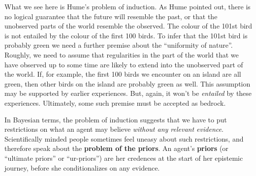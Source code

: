 What we see here is Hume's problem of induction. As Hume pointed out, there is
no logical guarantee that the future will resemble the past, or that the
unobserved parts of the world resemble the observed. The colour of the 101st
bird is not entailed by the colour of the first 100 birds. To infer that the
101st bird is probably green we need a further premise about the ``uniformity of
nature''. Roughly, we need to assume that regularities in the part of the world
that we have observed up to some time are likely to extend into the unobserved
part of the world. If, for example, the first 100 birds we encounter on an
island are all green, then other birds on the island are probably green as well.
This assumption may be supported by earlier experiences. But, again, it won't be
\emph{entailed} by these experiences. Ultimately, some such premise must be
accepted as bedrock.

In Bayesian terms, the problem of induction suggests that we have to put
restrictions on what an agent may believe \emph{without any relevant evidence}.
Scientifically minded people sometimes feel uneasy about such restrictions, and
therefore speak about the \textbf{problem of the priors}. An agent's
\textbf{priors} (or ``ultimate priors'' or ``ur-priors'') are her credences at
the start of her epistemic journey, before she conditionalizes on any evidence.

